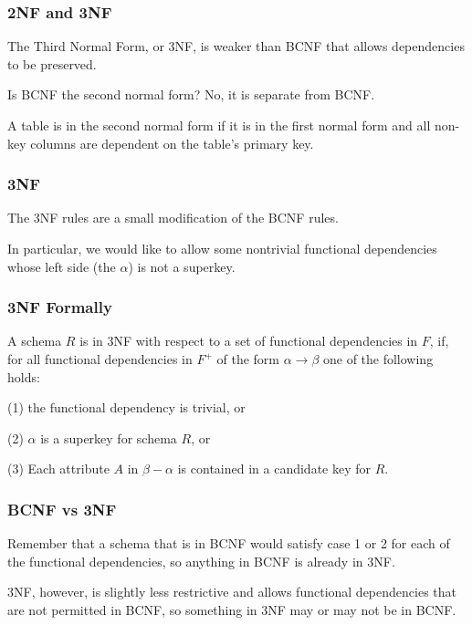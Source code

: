 \begin{frame}
\frametitle{2NF and 3NF}

The Third Normal Form, or 3NF, is weaker than BCNF that allows dependencies to be preserved. 

Is BCNF the second normal form? No, it is separate from BCNF. 

A table is in the second normal form if it is in the first normal form and all non-key columns are dependent on the table's primary key.

\end{frame}



\begin{frame}
\frametitle{3NF}

The 3NF rules are a small modification of the BCNF rules. 

In particular, we would like to allow some nontrivial functional dependencies whose left side (the $\alpha$) is not a superkey. 

\end{frame}


\begin{frame}
\frametitle{3NF Formally}
A schema $R$ is in 3NF with respect to a set of functional dependencies in $F$, if, for all functional dependencies in $F^{+}$ of the form $\alpha \rightarrow \beta$ one of the following holds: 

(1) the functional dependency is trivial, or 

(2) $\alpha$ is a superkey for schema $R$, or 

(3) Each attribute $A$ in $\beta - \alpha$ is contained in a candidate key for $R$.

\end{frame}



\begin{frame}
\frametitle{BCNF vs 3NF}

Remember that a schema that is in BCNF would satisfy case 1 or 2 for each of the functional dependencies, so anything in BCNF is already in 3NF. 

3NF, however, is slightly less restrictive and allows functional dependencies that are not permitted in BCNF, so something in 3NF may or may not be in BCNF.

\end{frame}



